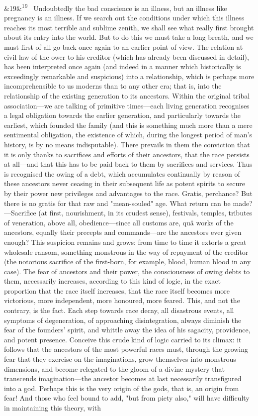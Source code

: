 \documentclass[12pt]{article}
\newcommand{\para}[1][]{\par\noindent\ifx&#1&\else\textsuperscript{\footnotesize #1}~\fi}
\begin{document}
\para[19] Undoubtedly the bad conscience is an illness, but an illness like pregnancy is an illness. If we search out the conditions under which this illness reaches its most terrible and sublime zenith, we shall see what really first brought about its entry into the world. But to do this we must take a long breath, and we must first of all go back once again to an earlier point of view. The relation at civil law of the ower to his creditor (which has already been discussed in detail), has been interpreted once again (and indeed in a manner which historically is exceedingly remarkable and suspicious) into a relationship, which is perhaps more incomprehensible to us moderns than to any other era; that is, into the relationship of the existing generation to its ancestors. Within the original tribal association---we are talking of primitive times---each living generation recognises a legal obligation towards the earlier generation, and particularly towards the earliest, which founded the family (and this is something much more than a mere sentimental obligation, the existence of which, during the longest period of man's history, is by no means indisputable). There prevails in them the conviction that it is only thanks to sacrifices and efforts of their ancestors, that the race persists at all---and that this has to be paid back to them by sacrifices and services. Thus is recognised the owing of a debt, which accumulates continually by reason of these ancestors never ceasing in their subsequent life as potent spirits to secure by their power new privileges and advantages to the race. Gratis, perchance? But there is no gratis for that raw and "mean-souled" age. What return can be made?---Sacrifice (at first, nourishment, in its crudest sense), festivals, temples, tributes of veneration, above all, obedience---since all customs are, quâ works of the ancestors, equally their precepts and commands---are the ancestors ever given enough? This suspicion remains and grows: from time to time it extorts a great wholesale ransom, something monstrous in the way of repayment of the creditor (the notorious sacrifice of the first-born, for example, blood, human blood in any case). The fear of ancestors and their power, the consciousness of owing debts to them, necessarily increases, according to this kind of logic, in the exact proportion that the race itself increases, that the race itself becomes more victorious, more independent, more honoured, more feared. This, and not the contrary, is the fact. Each step towards race decay, all disastrous events, all symptoms of degeneration, of approaching disintegration, always diminish the fear of the founders' spirit, and whittle away the idea of his sagacity, providence, and potent presence. Conceive this crude kind of logic carried to its climax: it follows that the ancestors of the most powerful races must, through the growing fear that they exercise on the imaginations, grow themselves into monstrous dimensions, and become relegated to the gloom of a divine mystery that transcends imagination---the ancestor becomes at last necessarily transfigured into a god. Perhaps this is the very origin of the gods, that is, an origin from fear! And those who feel bound to add, "but from piety also," will have difficulty in maintaining this theory, with 
\end{document}
